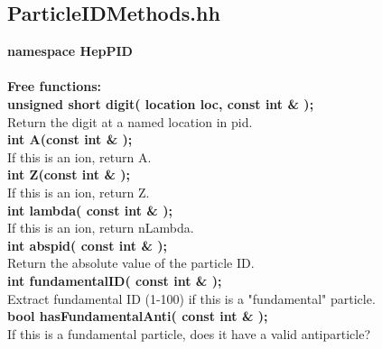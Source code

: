\subsection {ParticleIDMethods.hh}

\begin{tabbing}

{\bf namespace HepPID} \\  \\

{\bf Free functions:} \\

\hspace{0.5in} {\bf unsigned short digit( location loc, const int \& );} \\
\hspace{1.0in} Return the digit at a named location in pid.  \\

\hspace{0.5in} {\bf int A(const int \& );} \\
\hspace{1.0in} If this is an ion, return A.  \\

\hspace{0.5in} {\bf int Z(const int \& );} \\
\hspace{1.0in} If this is an ion, return Z.  \\

\hspace{0.5in} {\bf int lambda( const int \& );} \\
\hspace{1.0in} If this is an ion, return nLambda.  \\

\hspace{0.5in} {\bf int           abspid( const int \& );} \\
\hspace{1.0in} Return the absolute value of the particle ID.  \\

\hspace{0.5in} {\bf int    fundamentalID( const int \& );} \\
\hspace{1.0in} Extract fundamental ID (1-100) if this is a "fundamental" particle.  \\

\hspace{0.5in} {\bf bool hasFundamentalAnti( const int \& );} \\
\hspace{1.0in} If this is a fundamental particle, does it have a valid antiparticle?  \\


\end{tabbing}
